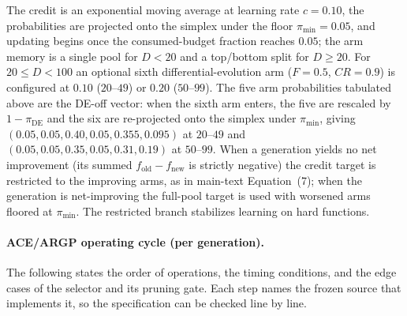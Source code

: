 \documentclass[10pt,a4paper]{article}
\begin{document}
The credit is an exponential moving average at learning rate $c=0.10$, the
probabilities are projected onto the simplex under the floor $\pi_{\min}=0.05$,
and updating begins once the consumed-budget fraction reaches $0.05$; the arm
memory is a single pool for $D<20$ and a top/bottom split for $D\ge 20$.  For
$20\le D<100$ an optional sixth differential-evolution arm ($F=0.5$, $CR=0.9$)
is configured at $0.10$ ($20$--$49$) or $0.20$ ($50$--$99$).  The five arm
probabilities tabulated above are the DE-off vector: when the sixth arm enters,
the five are rescaled by $1-\pi_{\mathrm{DE}}$ and the six are re-projected onto
the simplex under $\pi_{\min}$, giving $(0.05,0.05,0.40,0.05,0.355,0.095)$ at
$20$--$49$ and $(0.05,0.05,0.35,0.05,0.31,0.19)$ at $50$--$99$.  When a generation yields no net
improvement (its summed $f_{\mathrm{old}}-f_{\mathrm{new}}$ is strictly negative) the
credit target is restricted to the improving arms, as in main-text
Equation~(7); when the generation is net-improving the full-pool target is
used with worsened arms floored at $\pi_{\min}$.  The restricted branch
stabilizes learning on hard functions.


\paragraph{ACE/ARGP operating cycle (per generation).}
The following states the order of operations, the timing conditions, and the
edge cases of the selector and its pruning gate. Each step names the frozen
source that implements it, so the specification can be checked line by line.
\end{document}
